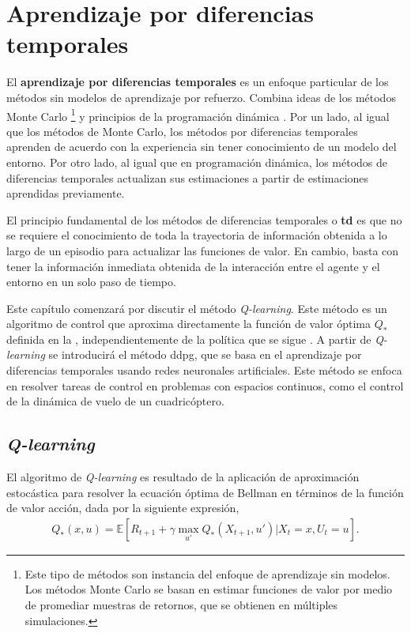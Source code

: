 \chapter{Aprendizaje por diferencias temporales} 
\label{chapter:model_free}

 
 El \textbf{aprendizaje por diferencias temporales} es un enfoque particular de los métodos sin modelos de aprendizaje por refuerzo. Combina ideas de los métodos Monte Carlo \footnote{Este tipo de métodos son instancia del enfoque de aprendizaje sin modelos. Los métodos Monte Carlo se basan en estimar funciones de valor por medio de promediar muestras de retornos, que se obtienen en múltiples simulaciones.}
 y principios de la programación dinámica \cite{Sutton2000}. Por un lado, al igual que los métodos de Monte Carlo, los métodos por diferencias temporales aprenden de acuerdo con la experiencia sin tener conocimiento de un modelo del entorno. Por otro lado, al igual que en programación dinámica, los métodos de diferencias temporales actualizan sus estimaciones a partir de estimaciones aprendidas previamente. 

El principio fundamental de los métodos de diferencias temporales o \textbf{\acrfull{td}} es que no se requiere 
el conocimiento de toda la trayectoria de información obtenida a lo largo de un episodio para actualizar las funciones de valor. En cambio, basta con tener la información inmediata obtenida de la interacción entre el agente y el entorno en un solo paso de tiempo.


Este capítulo comenzará por discutir el método \textit{Q-learning}. Este método es un algoritmo de control que aproxima directamente la función de valor óptima $Q_{*}$ definida en la , independientemente de la política que se sigue \cite{Sutton2018}. A partir de \textit{Q-learning} se introducirá el método \acrshort{ddpg}, que se basa en el aprendizaje por diferencias temporales usando redes neuronales artificiales. Este método se enfoca en resolver tareas de control en problemas con espacios continuos, como el control de la dinámica de vuelo de un cuadricóptero. 

\section{\textit{Q-learning}}
El algoritmo de \textit{Q-learning} es resultado de la aplicación de aproximación estocástica para resolver la ecuación óptima de Bellman en términos de la función de valor acción, dada por la siguiente expresión,
\begin{align}
    Q_{*}(x, u) = \mathbb{E}[R_{t+1} + \gamma\max_{u'}Q_{*}(X_{t+1}, u')|X_t=x,U_t=u].
    \label{eq:Bellman_opt_Q}
\end{align}


